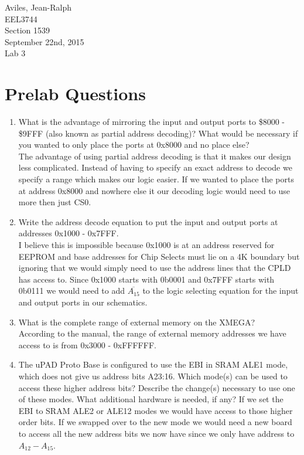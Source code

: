 \documentclass[letterpaper, 12pt]{article}
\newcommand{\hwnumber}{Lab 3}
\newcommand{\duedate}{September 22nd, 2015}
\newcommand{\capper}{\begin{flushright}Aviles, Jean-Ralph \\ EEL3744 \\ Section 1539 \\ \duedate{} \\ \hwnumber{}\end{flushright}}
\begin{document}
\capper{}
\section*{Prelab Questions}
\begin{enumerate}
  \item What is the advantage of mirroring the input and output ports to
    \$8000 - \$9FFF (also known as partial address decoding)? What would be
    necessary if you wanted to only place the ports at 0x8000 and no place else? \\
    \hspace*{8pt} The advantage of using partial address decoding is that it makes
    our design less complicated. Instead of having to specify an exact address to
    decode we specify a range which makes our logic easier. If we wanted to place
    the ports at address 0x8000 and nowhere else it our decoding logic would need
    to use more then just CS0.
  \item Write the address decode equation to put the input and output ports at
    addresses 0x1000 - 0x7FFF.  \\
    \hspace*{8pt} I believe this is impossible because 0x1000 is at an address
    reserved for EEPROM and base addresses for Chip Selects must lie on a 4K
    boundary but ignoring that we would simply need to use the address lines
    that the CPLD has access to. Since 0x1000 starts with 0b0001 and 0x7FFF
    starts with 0b0111 we would need to add $\overline{A_{15}}$ to the logic
    selecting equation for the input and output ports in our schematics.
  \item What is the complete range of external memory on the XMEGA? \\
    \hspace*{8pt} According to the manual, the range of external memory
    addresses we have access to is from 0x3000 - 0xFFFFFF.
  \item The uPAD Proto Base is configured to use the EBI in SRAM ALE1 mode,
    which does not give us address bits A23:16. Which mode(s) can be used to
    access these higher address bits? Describe the change(s) necessary to use
    one of these modes. What additional hardware is needed, if any?
    \hspace*{8pt} If we set the EBI to SRAM ALE2 or ALE12 modes we would have
    access to those higher order bits. If we swapped over to the new mode we
    would need a new board to access all the new address bits we now have since
    we only have address to $A_{12} - A_{15}$.

\end{enumerate}
\end{document}
